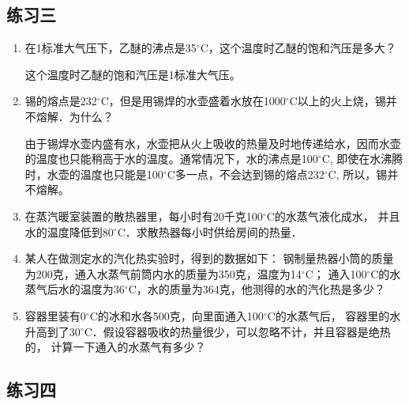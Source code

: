 \subsection{练习三}
\begin{enumerate}
 \item 在1标准大气压下，乙醚的沸点是35$^\circ$C，这个温度时乙醚的饱和汽压是多大？
    
 \begin{solution}
这个温度时乙醚的饱和汽压是1标准大气压。
 \end{solution}
  \item 锡的熔点是232$^\circ$C，但是用锡焊的水壶盛着水放在1000$^\circ$C以上的火上烧，锡并不熔解．为什么？
    
  \begin{solution}
    由于锡焊水壶内盛有水，水壶把从火上吸收的热量及时地传递给水，因而水壶的温度也只能稍高于水的温度。通常情况下，水的沸点是100$^\circ$C, 即使在水沸腾时，水壶的温度也只能是100$^\circ$C多一点，不会达到锡的熔点232$^\circ$C, 所以，锡并不熔解。
  \end{solution}
  \item 在蒸汽暖室装置的散热器里，每小时有20千克100$^\circ$C的水蒸气液化成水，
    并且水的温度降低到80$^\circ$C．求散热器每小时供给房间的热量．
    
    \begin{solution}
      
    \end{solution}
    \item 某人在做测定水的汽化热实验时，得到的数据如下：
   钢制量热器小筒的质量为200克，通入水蒸气前筒内水的质量为350克，温度为14$^\circ$C；
    通入100$^\circ$C的水蒸气后水的温度为36$^\circ$C，水的质量为364克，他测得的水的汽化热是多少？
    
    \begin{solution}
      
    \end{solution}
    \item 容器里装有0$^\circ$C的冰和水各500克，向里面通入100$^\circ$C的水蒸气后，
    容器里的水升高到了30$^\circ$C．假设容器吸收的热量很少，可以忽略不计，并且容器是绝热的，
    计算一下通入的水蒸气有多少？
    
    \begin{solution}
      
    \end{solution}
\end{enumerate}




\subsection{练习四}

